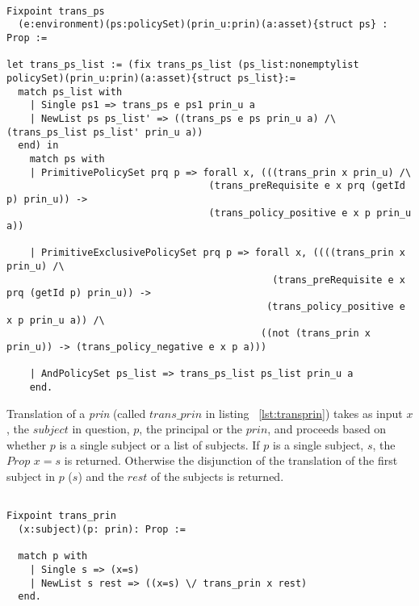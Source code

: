\begin{minipage}{\linewidth}
\begin{lstlisting}

Fixpoint trans_ps
  (e:environment)(ps:policySet)(prin_u:prin)(a:asset){struct ps} : Prop :=

let trans_ps_list := (fix trans_ps_list (ps_list:nonemptylist policySet)(prin_u:prin)(a:asset){struct ps_list}:=
  match ps_list with
    | Single ps1 => trans_ps e ps1 prin_u a
    | NewList ps ps_list' => ((trans_ps e ps prin_u a) /\ (trans_ps_list ps_list' prin_u a))
  end) in
    match ps with
    | PrimitivePolicySet prq p => forall x, (((trans_prin x prin_u) /\ 
                                   (trans_preRequisite e x prq (getId p) prin_u)) -> 
                                   (trans_policy_positive e x p prin_u a))  

    | PrimitiveExclusivePolicySet prq p => forall x, ((((trans_prin x prin_u) /\ 
                                              (trans_preRequisite e x prq (getId p) prin_u)) -> 
                                             (trans_policy_positive e x p prin_u a)) /\
                                            ((not (trans_prin x prin_u)) -> (trans_policy_negative e x p a)))
                   
    | AndPolicySet ps_list => trans_ps_list ps_list prin_u a
    end.
\end{lstlisting}
\end{minipage}



Translation of a \emph{prin} (called $trans\_prin$ in listing ~\ref{lst:transprin}) takes as input $x$, the $subject$ in question, $p$, the principal or the $prin$,  and proceeds based on whether $p$ is a single subject or a list of subjects. If $p$ is a single subject, $s$, the $Prop$ $x=s$ is returned. Otherwise the disjunction of the translation of the first subject in $p$ ($s$) and the $rest$ of the subjects is returned.

\begin{lstlisting}

Fixpoint trans_prin
  (x:subject)(p: prin): Prop :=

  match p with
    | Single s => (x=s)
    | NewList s rest => ((x=s) \/ trans_prin x rest)
  end.
\end{lstlisting}


